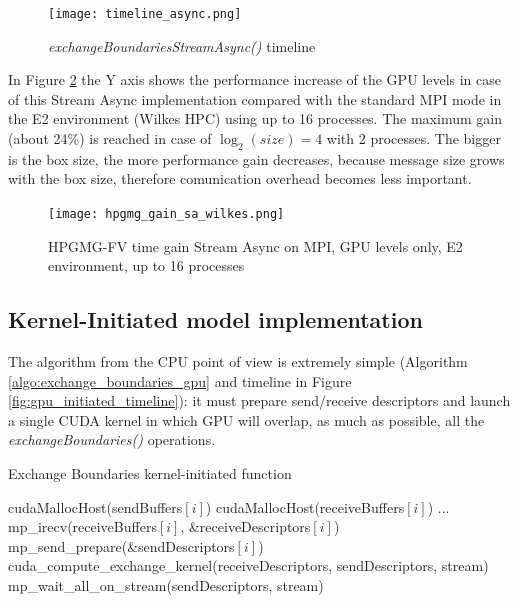 \documentclass[review]{siamart1116}
\begin{document}
\begin{figure}[h]
\centering
\texttt{[image: timeline\_async.png]}
\caption{\textit{exchangeBoundariesStreamAsync()} timeline}
\label{fig:timeline_async}
\end{figure}

%
In Figure \ref{fig:hpgmg_gain_sa_wilkes} the Y axis shows the performance increase of the GPU levels in case of this Stream Async implementation compared with the standard MPI mode in the E2 environment (Wilkes HPC) using up to 16 processes.
%
The maximum gain (about 24\%) is reached in case of $\log_2(size)=4$
with 2 processes. The bigger is the box size, the more performance
gain decreases, because message size grows with the box size,
therefore comunication overhead becomes less important.

\begin{figure}[htb]
\centering
\texttt{[image: hpgmg\_gain\_sa\_wilkes.png]}
\caption{HPGMG-FV time gain Stream Async on MPI, GPU levels only, E2 environment, up to 16 processes}
\label{fig:hpgmg_gain_sa_wilkes}
\end{figure}

\subsection{Kernel-Initiated model implementation}\label{sec:kihpgmg}

The algorithm from the CPU point of view is extremely simple (Algorithm \ref{algo:exchange_boundaries_gpu} and timeline in Figure \ref{fig:gpu_initiated_timeline}): it must prepare send/receive descriptors and launch a single CUDA kernel in which GPU will overlap, as much as possible, all the \textit{exchangeBoundaries()} operations.

\begin{algorithm}
\small
\caption{Exchange Boundaries kernel-initiated function}
\label{algo:exchange_boundaries_gpu}
\begin{algorithmic}[1]
\State cudaMallocHost(sendBuffers$[i]$)
\State cudaMallocHost(receiveBuffers$[i]$)
\EndFor
\State ...
                \State mp\_irecv(receiveBuffers$[i]$, \&receiveDescriptors$[i]$)
        \EndFor
                \State mp\_send\_prepare(\&sendDescriptors$[i]$)
        \EndFor
        \State cuda\_compute\_exchange\_kernel(receiveDescriptors, sendDescriptors, stream)
        \State mp\_wait\_all\_on\_stream(sendDescriptors, stream)
\EndFunction
\end{algorithmic}
\end{algorithm}
\end{document}
